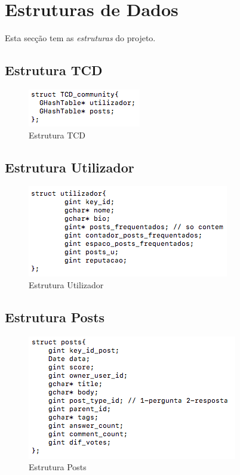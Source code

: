 \documentclass[a4paper]{article}
\begin{document}
\section{Estruturas de Dados}
\label{sec:estruturas}

Esta secção tem as \emph{estruturas} do projeto.

\subsection{Estrutura TCD}
\begin{figure}[ht]
\centering
\includegraphics[scale=0.50]{image_tcd}
\caption{Estrutura TCD} 
\label{img:tcd}
\end{figure}

\subsection{Estrutura Utilizador}
\begin{figure}[ht]
\centering
\includegraphics[scale=0.50]{image_utilizador}
\caption{Estrutura Utilizador} 
\label{img:utilizador}
\end{figure}

\subsection{Estrutura Posts}
\begin{figure}[ht]
\centering
\includegraphics[scale=0.50]{image_posts}
\caption{Estrutura Posts} 
\label{img:posts}
\end{figure}
\end{document}
